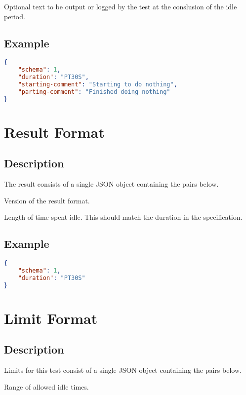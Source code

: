 \documentclass[10pt]{article}
\begin{document}
 Optional text to be output or
logged by the test at the conslusion of the idle period.

\subsection{Example}
\begin{lstlisting}[language=json]
{
    "schema": 1,
    "duration": "PT30S",
    "starting-comment": "Starting to do nothing",
    "parting-comment": "Finished doing nothing"
}
\end{lstlisting}


%
%

\section{Result Format}

\subsection{Description}
The result consists of a single JSON object containing the pairs
below.  \seejson

 Version of the result format.

 Length of time spent idle.  This should
match the duration in the specification.


\subsection{Example}
\begin{lstlisting}[language=json]
{
    "schema": 1,
    "duration": "PT30S"
}
\end{lstlisting}



%
%

\section{Limit Format}

\subsection{Description}
Limits for this test consist of a single JSON object containing the
pairs below.  \seelimit

 Range of allowed idle times.
\end{document}
